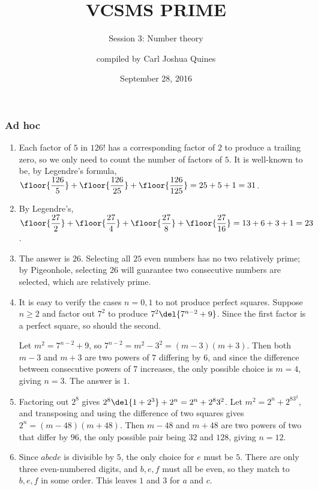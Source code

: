\documentclass[10pt,paper=letter]{scrartcl}
\begin{document}
\title{VCSMS PRIME}
\subtitle{Session 3: Number theory}
\author{compiled by Carl Joshua Quines}
\date{September 28, 2016}

\maketitle

\subsubsection*{Ad hoc}

\begin{enumerate}

\item Each factor of $5$ in $126!$ has a corresponding factor of $2$ to produce a trailing zero, so we only need to count the number of factors of $5$. It is well-known to be, by Legendre's formula, $\floor{\dfrac{126}5} + \floor{\dfrac{126}{25}} + \floor{\dfrac{126}{125}} = 25 + 5 + 1 = 31$.

\item By Legendre's, $\floor{\dfrac{27}2} + \floor{\dfrac{27}4} + \floor{\dfrac{27}8} + \floor{\dfrac{27}{16}} = 13 + 6 + 3 + 1 = 23$.

\item The answer is $26$. Selecting all $25$ even numbers has no two relatively prime; by Pigeonhole, selecting $26$ will guarantee two consecutive numbers are selected, which are relatively prime.

\item It is easy to verify the cases $n = 0, 1$ to not produce perfect squares. Suppose $n \geq 2$ and factor out $7^2$ to produce $7^2\del{7^{n-2} + 9}$. Since the first factor is a perfect square, so should the second.

Let $m^2 = 7^{n-2} + 9$, so $7^{n-2} = m^2 - 3^2 = (m-3)(m+3)$. Then both $m-3$ and $m+3$ are two powers of $7$ differing by $6$, and since the difference between consecutive powers of $7$ increases, the only possible choice is $m = 4$, giving $n = 3$. The answer is $1$.

\item Factoring out $2^8$ gives $2^8\del{1 + 2^3} + 2^n = 2^n + 2^83^2$. Let $m^2 = 2^n + 2^83^2$, and transposing and using the difference of two squares gives $2^n = (m - 48)(m + 48)$. Then $m - 48$ and $m + 48$ are two powers of two that differ by $96$, the only possible pair being $32$ and $128$, giving $n = 12$.

\item Since $abcde$ is divisible by $5$, the only choice for $e$ must be $5$. There are only three even-numbered digits, and $b, e, f$ must all be even, so they match to $b, e, f$ in some order. This leaves $1$ and $3$ for $a$ and $c$.


\end{enumerate}
\end{document}
